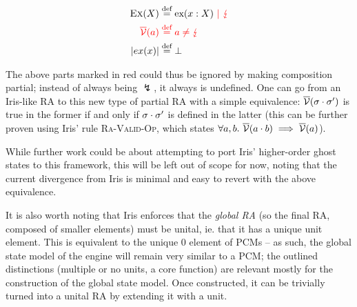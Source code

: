 \begin{align*}
	\textsc{Ex}(X) &\stackrel{\textnormal{def}}= \text{ex}(x:X) \color{red} ~|~ \lightning\\
	\color{red}\overline{\cal V}(a) &\color{red}\stackrel{\textnormal{def}}= a \neq \lightning\\
	|ex(x)| &\stackrel{\textnormal{def}}= \bot
\end{align*}

The above parts marked in {\color{red}red} could thus be ignored by making composition partial; instead of always being $\lightning$, it always is undefined. One can go from an Iris-like RA to this new type of partial RA with a simple equivalence: $\overline{\cal V}(\sigma\cdot\sigma')$ is true in the former if and only if $\sigma\cdot\sigma'$ is defined in the latter (this can be further proven using Iris' rule \textsc{Ra-Valid-Op}, which states $\forall a,b.~ \overline{\cal V}(a\cdot b)\implies \overline{\cal V}(a)$).

While further work could be about attempting to port Iris' higher-order ghost states to this framework, this will be left out of scope for now, noting that the current divergence from Iris is minimal and easy to revert with the above equivalence.

It is also worth noting that Iris enforces that the \emph{global RA} (so the final RA, composed of smaller elements) must be unital, ie. that it has a unique unit element. This is equivalent to the unique $0$ element of PCMs -- as such, the global state model of the engine will remain very similar to a PCM; the outlined distinctions (multiple or no units, a core function) are relevant mostly for the construction of the global state model. Once constructed, it can be trivially turned into a unital RA by extending it with a unit.


